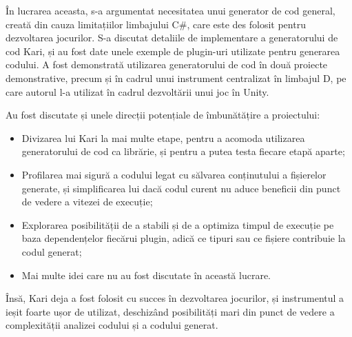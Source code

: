 \documentclass{report}
\begin{document}
În lucrarea aceasta, s-a argumentat necesitatea unui generator de cod general, creată din cauza limitațiilor limbajului C\#, care este des folosit pentru dezvoltarea jocurilor.
S-a discutat detaliile de implementare a generatorului de cod Kari, și au fost date unele exemple de plugin-uri utilizate pentru generarea codului.
A fost demonstrată utilizarea generatorului de cod în două proiecte demonstrative, precum și în cadrul unui instrument centralizat în limbajul D, pe care autorul l-a utilizat în cadrul dezvoltării unui joc în Unity. 


Au fost discutate și unele direcții potențiale de îmbunătățire a proiectului:

\begin{itemize}
  \item Divizarea lui Kari la mai multe etape, pentru a acomoda utilizarea generatorului de cod ca librărie, și pentru a putea testa fiecare etapă aparte;
  \item Profilarea mai sigură a codului legat cu sălvarea conținutului a fișierelor generate, și simplificarea lui dacă codul curent nu aduce beneficii din punct de vedere a vitezei de execuție;
  \item Explorarea posibilității de a stabili și de a optimiza timpul de execuție pe baza dependențelor fiecărui plugin, adică ce tipuri sau ce fișiere contribuie la codul generat;
  \item Mai multe idei care nu au fost discutate în această lucrare.
\end{itemize}

Însă, Kari deja a fost folosit cu succes în dezvoltarea jocurilor, și instrumentul a ieșit foarte ușor de utilizat, deschizând posibilități mari din punct de vedere a complexității analizei codului și a codului generat.



\end{document}
